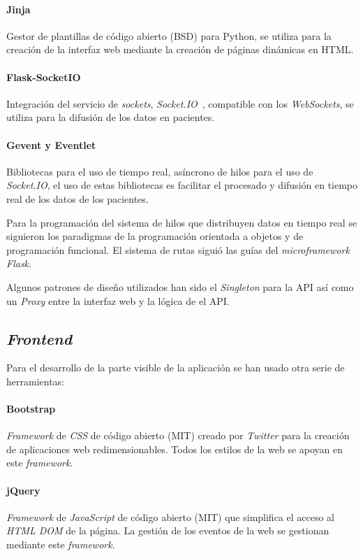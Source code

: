 \paragraph{Jinja~\cite{tool:jinja}}Gestor de plantillas de código abierto (BSD) para Python, se utiliza para la creación de la interfaz web mediante la creación de páginas dinámicas en HTML.
\paragraph{Flask-SocketIO~\cite{tool:flask-socketio}}Integración del servicio de \textit{sockets}, \textit{Socket.IO}~\cite{tool:socketio}, compatible con los \textit{WebSockets}, se utiliza para la difusión de los datos en pacientes.
\paragraph{Gevent y Eventlet~\cite{tool:eventlet, tool:gevent}}Bibliotecas para el uso de tiempo real, asíncrono de hilos para el uso de \textit{Socket.IO}, el uso de estas bibliotecas es facilitar el procesado y difusión en tiempo real de los datos de los pacientes. 

Para la programación del sistema de hilos que distribuyen datos en tiempo real se siguieron los paradigmas de la programación orientada a objetos y de programación funcional. El sistema de rutas siguió las guías del \textit{microframework Flask}. 

Algunos patrones de diseño utilizados han sido el \textit{Singleton} para la API así como un \textit{Proxy} entre la interfaz web y la lógica de el API.

\subsection{\textit{Frontend}}

Para el desarrollo de la parte visible de la aplicación se han usado otra serie de herramientas:
\paragraph{Bootstrap~\cite{wiki:boostrap}}\textit{Framework} de \textit{CSS} de código abierto (MIT) creado por \textit{Twitter} para la creación de aplicaciones web redimensionables. Todos los estilos de la web se apoyan en este \textit{framework}.
\paragraph{jQuery~\cite{wiki:jquery}}\textit{Framework} de \textit{JavaScript} de código abierto (MIT) que simplifica el acceso al \textit{HTML DOM} de la página. La gestión de los eventos de la web se gestionan mediante este \textit{framework}.
